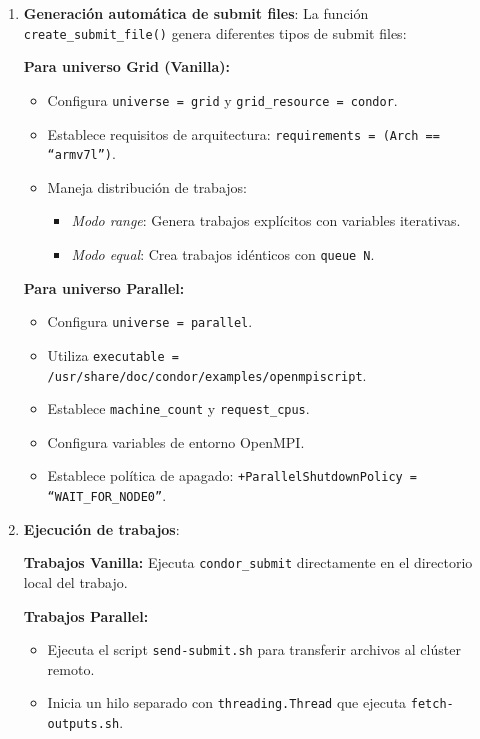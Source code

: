 \begin{enumerate}
	\item \textbf{Generación automática de submit files}: La función \texttt{create\_submit\_file()} genera diferentes tipos de submit files:

	      \textbf{Para universo Grid (Vanilla):}
	      \begin{itemize}
		      \item Configura \texttt{universe = grid} y \texttt{grid\_resource = condor}.
		      \item Establece requisitos de arquitectura: \texttt{requirements = (Arch == ``armv7l'')}.
		      \item Maneja distribución de trabajos:
		            \begin{itemize}
			            \item \textit{Modo range}: Genera trabajos explícitos con variables iterativas.
			            \item \textit{Modo equal}: Crea trabajos idénticos con \texttt{queue N}.
		            \end{itemize}
	      \end{itemize}

	      \textbf{Para universo Parallel:}
	      \begin{itemize}
		      \item Configura \texttt{universe = parallel}.
		      \item Utiliza \texttt{executable = /usr/share/doc/condor/examples/openmpiscript}.
		      \item Establece \texttt{machine\_count} y \texttt{request\_cpus}.
		      \item Configura variables de entorno OpenMPI.
		      \item Establece política de apagado: \texttt{+ParallelShutdownPolicy = ``WAIT\_FOR\_NODE0''}.
	      \end{itemize}

	\item \textbf{Ejecución de trabajos}:

	      \textbf{Trabajos Vanilla:} Ejecuta \texttt{condor\_submit} directamente en el directorio local del trabajo.

	      \textbf{Trabajos Parallel:}
	      \begin{itemize}
		      \item Ejecuta el script \texttt{send-submit.sh} para transferir archivos al clúster remoto.
		      \item Inicia un hilo separado con \texttt{threading.Thread} que ejecuta \texttt{fetch-outputs.sh}.
	      \end{itemize}


\end{enumerate}
